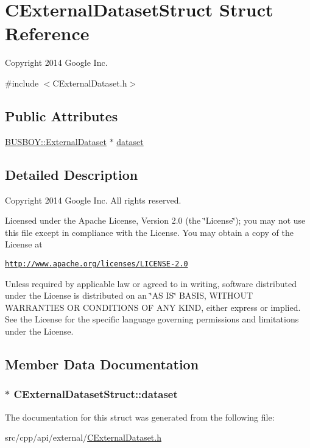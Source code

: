\hypertarget{structCExternalDatasetStruct}{
\section{CExternalDatasetStruct Struct Reference}
\label{structCExternalDatasetStruct}
}


Copyright 2014 Google Inc.  


{\ttfamily \#include $<$CExternalDataset.h$>$}\subsection*{Public Attributes}
\begin{DoxyCompactItemize}
\item 
\hyperlink{classBUSBOY_1_1ExternalDataset}{BUSBOY::ExternalDataset} $\ast$ \hyperlink{structCExternalDatasetStruct_a6ad5aa274ba39aa2e44bd9e63c64ce4a}{dataset}
\end{DoxyCompactItemize}


\subsection{Detailed Description}
Copyright 2014 Google Inc. All rights reserved.

Licensed under the Apache License, Version 2.0 (the \char`\"{}License\char`\"{}); you may not use this file except in compliance with the License. You may obtain a copy of the License at

\href{http://www.apache.org/licenses/LICENSE-2.0}{\tt http://www.apache.org/licenses/LICENSE-\/2.0}

Unless required by applicable law or agreed to in writing, software distributed under the License is distributed on an \char`\"{}AS IS\char`\"{} BASIS, WITHOUT WARRANTIES OR CONDITIONS OF ANY KIND, either express or implied. See the License for the specific language governing permissions and limitations under the License. 

\subsection{Member Data Documentation}
\hypertarget{structCExternalDatasetStruct_a6ad5aa274ba39aa2e44bd9e63c64ce4a}{
\subsubsection[{dataset}]{$\ast$ {\bf CExternalDatasetStruct::dataset}}}
\label{structCExternalDatasetStruct_a6ad5aa274ba39aa2e44bd9e63c64ce4a}


The documentation for this struct was generated from the following file:\begin{DoxyCompactItemize}
\item 
src/cpp/api/external/\hyperlink{CExternalDataset_8h}{CExternalDataset.h}\end{DoxyCompactItemize}
